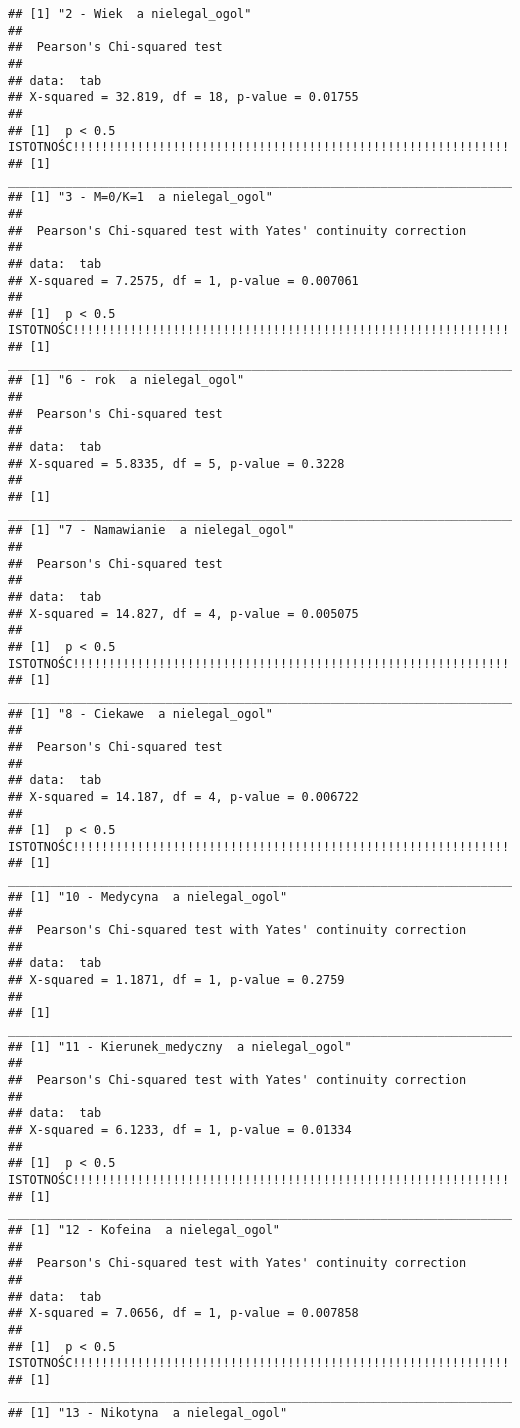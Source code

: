 \documentclass[]{article}
\begin{document}
\begin{verbatim}
## [1] "2 - Wiek  a nielegal_ogol"
## 
##  Pearson's Chi-squared test
## 
## data:  tab
## X-squared = 32.819, df = 18, p-value = 0.01755
## 
## [1]  p < 0.5 ISTOTNOŚC!!!!!!!!!!!!!!!!!!!!!!!!!!!!!!!!!!!!!!!!!!!!!!!!!!!!!!!!!!!!!!!!
## [1] _______________________________________________________________________________
## [1] "3 - M=0/K=1  a nielegal_ogol"
## 
##  Pearson's Chi-squared test with Yates' continuity correction
## 
## data:  tab
## X-squared = 7.2575, df = 1, p-value = 0.007061
## 
## [1]  p < 0.5 ISTOTNOŚC!!!!!!!!!!!!!!!!!!!!!!!!!!!!!!!!!!!!!!!!!!!!!!!!!!!!!!!!!!!!!!!!
## [1] _______________________________________________________________________________
## [1] "6 - rok  a nielegal_ogol"
## 
##  Pearson's Chi-squared test
## 
## data:  tab
## X-squared = 5.8335, df = 5, p-value = 0.3228
## 
## [1] _______________________________________________________________________________
## [1] "7 - Namawianie  a nielegal_ogol"
## 
##  Pearson's Chi-squared test
## 
## data:  tab
## X-squared = 14.827, df = 4, p-value = 0.005075
## 
## [1]  p < 0.5 ISTOTNOŚC!!!!!!!!!!!!!!!!!!!!!!!!!!!!!!!!!!!!!!!!!!!!!!!!!!!!!!!!!!!!!!!!
## [1] _______________________________________________________________________________
## [1] "8 - Ciekawe  a nielegal_ogol"
## 
##  Pearson's Chi-squared test
## 
## data:  tab
## X-squared = 14.187, df = 4, p-value = 0.006722
## 
## [1]  p < 0.5 ISTOTNOŚC!!!!!!!!!!!!!!!!!!!!!!!!!!!!!!!!!!!!!!!!!!!!!!!!!!!!!!!!!!!!!!!!
## [1] _______________________________________________________________________________
## [1] "10 - Medycyna  a nielegal_ogol"
## 
##  Pearson's Chi-squared test with Yates' continuity correction
## 
## data:  tab
## X-squared = 1.1871, df = 1, p-value = 0.2759
## 
## [1] _______________________________________________________________________________
## [1] "11 - Kierunek_medyczny  a nielegal_ogol"
## 
##  Pearson's Chi-squared test with Yates' continuity correction
## 
## data:  tab
## X-squared = 6.1233, df = 1, p-value = 0.01334
## 
## [1]  p < 0.5 ISTOTNOŚC!!!!!!!!!!!!!!!!!!!!!!!!!!!!!!!!!!!!!!!!!!!!!!!!!!!!!!!!!!!!!!!!
## [1] _______________________________________________________________________________
## [1] "12 - Kofeina  a nielegal_ogol"
## 
##  Pearson's Chi-squared test with Yates' continuity correction
## 
## data:  tab
## X-squared = 7.0656, df = 1, p-value = 0.007858
## 
## [1]  p < 0.5 ISTOTNOŚC!!!!!!!!!!!!!!!!!!!!!!!!!!!!!!!!!!!!!!!!!!!!!!!!!!!!!!!!!!!!!!!!
## [1] _______________________________________________________________________________
## [1] "13 - Nikotyna  a nielegal_ogol"

\end{verbatim}
\end{document}
